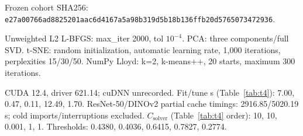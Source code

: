 Frozen cohort SHA256: \texttt{e27a00766ad8825201aac6d4167a5a98b}\allowbreak\texttt{319d5b18b136ffb20d5765073472936}.

Unweighted L2 L-BFGS: max\_iter 2000, tol $10^{-4}$. PCA: three components/full SVD. t-SNE: random initialization, automatic learning rate, 1,000 iterations, perplexities 15/30/50. NumPy Lloyd: k=2, k-means++, 20 starts, maximum 300 iterations.

CUDA 12.4, driver 621.14; cuDNN unrecorded. Fit/tune s (Table~\ref{tab:t4}): 7.00, 0.47, 0.11, 12.49, 1.70. ResNet-50/DINOv2 partial cache timings: 2916.85/5020.19 s; cold imports/interruptions excluded. $C_{\mathrm{solver}}$ (Table~\ref{tab:t4} order): 10, 10, 0.001, 1, 1. Thresholds: 0.4380, 0.4036, 0.6415, 0.7827, 0.2774.
